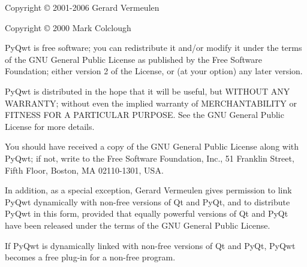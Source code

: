 Copyright \copyright{} 2001-2006 Gerard Vermeulen

Copyright \copyright{} 2000 Mark Colclough

PyQwt is free software; you can redistribute it and/or modify
it under the terms of the GNU General Public License as published by
the Free Software Foundation; either version 2 of the License, or
(at your option) any later version.

PyQwt is distributed in the hope that it will be useful,
but WITHOUT ANY WARRANTY; without even the implied warranty of
MERCHANTABILITY or FITNESS FOR A PARTICULAR PURPOSE.  See the
GNU General Public License for more details.

You should have received a copy of the GNU General Public License along
with PyQwt; if not, write to the Free Software Foundation, Inc.,
51 Franklin Street, Fifth Floor, Boston, MA  02110-1301, USA.

In addition, as a special exception, Gerard Vermeulen gives permission
to link PyQwt dynamically with non-free versions of Qt and PyQt,
and to distribute PyQwt in this form, provided that equally powerful
versions of Qt and PyQt have been released under the terms of the GNU
General Public License.

If PyQwt is dynamically linked with non-free versions of Qt and PyQt,
PyQwt becomes a free plug-in for a non-free program.




